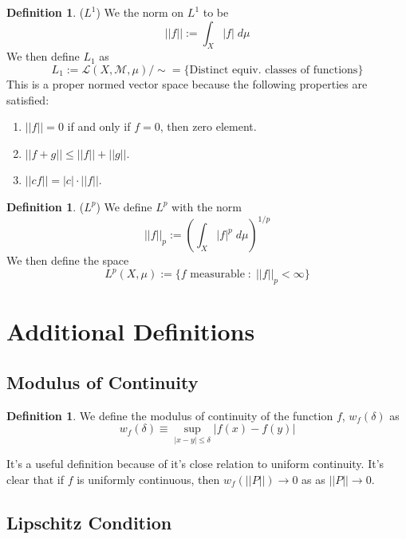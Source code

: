 \documentclass[12pt]{article}
\theoremstyle{plain}
\theoremstyle{definition}
\newtheorem{defn}[thm]{Definition}
\theoremstyle{remark}
\begin{document}
\begin{defn} ($L^1$) We the norm on $L^1$ to be
\[
    ||f||:= \int_X |f| \; d\mu
\]
We then define $L_1$ as
\[
    L_1 := \mathscr{L}(X,\mathscr{M},\mu) / \sim
    = \{\text{Distinct equiv. classes of functions}\}
\]
This is a proper normed vector space because the following properties are satisfied:
\begin{enumerate}
    \item $||f|| = 0$ if and only if $f=0$, then zero element.
    \item $||f+g||\leq ||f|| + ||g||$.
    \item $||c f|| = |c| \cdot ||f||$.
\end{enumerate}
\end{defn}

\begin{defn} ($L^p$) We define $L^p$ with the norm
\[
    ||f||_p:= \left(\int_X |f|^p \; d\mu\right)^{1/p}
\]
We then define the space
\[
    L^p(X,\mu) := \{\text{$f$ measurable}\;:\;
    \text{$||f||_p < \infty$}\}
\]
\end{defn}





\newpage
\appendix


\section{Additional Definitions}

\subsection{Modulus of Continuity}

\begin{defn} We define the modulus of continuity of the function $f$, $w_f(\delta)$ as 
\begin{equation}
    w_f(\delta) \equiv \sup_{|x-y|\leq\delta} |f(x)-f(y)|
\end{equation}
\end{defn}
It's a useful definition because of it's close relation to uniform continuity.
It's clear that if $f$ is uniformly continuous, then $w_f\left(||P||\right)\rightarrow0$ as as $||P||\rightarrow0$.

\subsection{Lipschitz Condition}
\end{document}
